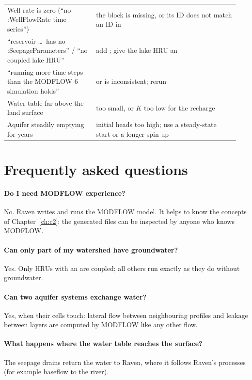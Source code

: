 \begin{table}[!htbp]
\begin{tabular}{P{0.36\linewidth}P{0.588\linewidth}}
Well rate is zero (``no :WellFlowRate time series'') & the  block is missing, or its ID does not match an ID in \\
``reservoir \dots\ has no :SeepageParameters'' / ``no coupled lake HRU'' & add ; give the lake HRU an \\
``running more time steps than the MODFLOW 6 simulation holds'' &  or  is inconsistent; rerun\\
Water table far above the land surface &  too small, or $K$ too low for the recharge\\
Aquifer steadily emptying for years & initial heads too high; use a steady-state start or a longer spin-up\\\bottomrule
\end{tabular}
\end{table}

\section{Frequently asked questions}
\paragraph{Do I need MODFLOW experience?} No. Raven writes and runs the MODFLOW model. It helps to know the concepts of
Chapter~\ref{ch:c2}; the generated files can be inspected by anyone who knows MODFLOW.
\paragraph{Can only part of my watershed have groundwater?} Yes. Only HRUs with an  are coupled; all
others run exactly as they do without groundwater.
\paragraph{Can two aquifer systems exchange water?} Yes, when their cells touch: lateral flow between neighbouring profiles and
leakage between layers are computed by MODFLOW like any other flow.
\paragraph{What happens where the water table reaches the surface?} The seepage drains return the water to Raven, where it
follows Raven's processes (for example baseflow to the river).
